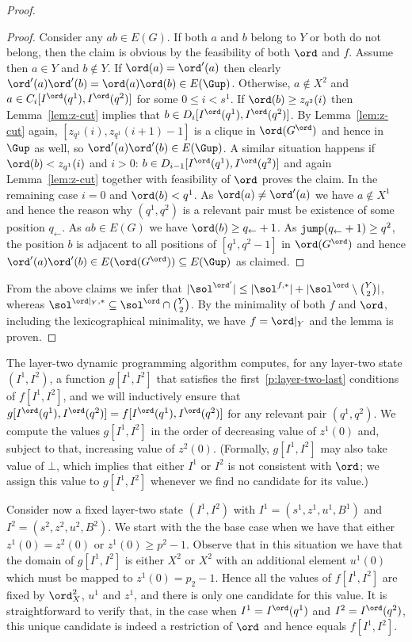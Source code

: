 \begin{proof}
\begin{proof}
Consider any $ab \in E(G)$. If both $a$ and $b$ belong to $Y$ or both do not belong,
then the claim is obvious by the feasibility of both $\ord$ and $f$.
Assume then $a \in Y$ and $b \notin Y$. If $\ord(a) = \ord'(a)$ then clearly $\ord'(a)\ord'(b) = \ord(a)\ord(b) \in E(\Gup)$. 
Otherwise, $a \notin X^2$ and $a \in C_i[I^\ord(q^1),I^\ord(q^2)]$ for some $0 \leq i < s^1$.
If $\ord(b) \geq z_{q^2}(i)$ then Lemma~\ref{lem:z-cut} implies that $b \in D_i[I^\ord(q^1),I^\ord(q^2)]$.
By Lemma~\ref{lem:z-cut} again, $[z_{q^1}(i),z_{q^1}(i+1)-1]$ is a clique in $\ord(G^\ord)$ and hence in $\Gup$ as well, so $\ord'(a)\ord'(b) \in E(\Gup)$.
A similar situation happens if $\ord(b) < z_{q^1}(i)$ and $i>0$: $b \in D_{i-1}[I^\ord(q^1),I^\ord(q^2)]$ and again Lemma~\ref{lem:z-cut}
together with feasibility of $\ord$ proves the claim.
In the remaining case $i = 0$ and $\ord(b) < q^1$. As $\ord(a) \neq \ord'(a)$ we have $a \notin X^1$ and hence the reason why $(q^1,q^2)$ is a relevant pair
must be existence of some position $q_\leftarrow$. As $ab \in E(G)$ we have $\ord(b) \geq q_\leftarrow+1$. As $\mathtt{jump}(q_\leftarrow+1) \geq q^2$,
the position $b$ is adjacent to all positions of $[q^1,q^2-1]$ in $\ord(G^\ord)$ and hence $\ord'(a)\ord'(b) \in E(\ord(G^\ord)) \subseteq E(\Gup)$ as claimed.
\cqed\end{proof}

From the above claims we infer that $|\sol^{\ord'}| \leq |\sol^{f,\ast}| + |\sol^\ord \setminus \binom{Y}{2}|$, whereas
$\sol^{\ord|_Y,\ast} \subseteq \sol^\ord \cap \binom{Y}{2}$.
By the minimality of both $f$ and $\ord$, including the lexicographical minimality, we have $f = \ord|_Y$ and the lemma is proven.
\end{proof}

The layer-two dynamic programming algorithm computes,
for any layer-two state $(I^1,I^2)$,   
a function $g[I^1,I^2]$
that satisfies the first~\ref{p:layer-two-last} conditions of $f[I^1,I^2]$, and we will inductively ensure that $g[I^\ord(q^1),I^\ord(q^2)] = f[I^\ord(q^1),I^\ord(q^2)]$
for any relevant pair $(q^1,q^2)$.
We compute the values $g[I^1,I^2]$ in the order of decreasing value of $z^1(0)$ and, subject to that, increasing value of $z^2(0)$.
(Formally, $g[I^1,I^2]$ may also take value of $\bot$, which implies that either $I^1$ or $I^2$ is not consistent with $\ord$;
 we assign this value to $g[I^1,I^2]$ whenever we find no candidate for its value.)

Consider now a fixed layer-two state $(I^1,I^2)$ with
$I^1 = (s^1,z^1,u^1,B^1)$ and $I^2 = (s^2,z^2,u^2,B^2)$.
We start with the the base case when we have that either $z^1(0) = z^2(0)$ or
$z^1(0) \geq p^2-1$. Observe that in this situation we have that the domain of $g[I^1,I^2]$ is either $X^2$ or $X^2$ with an additional element $u^1(0)$ which must be mapped to $z^1(0)=p_2-1$. Hence all the values of $f[I^1,I^2]$ are fixed by $\ord_X^2$, $u^1$ and $z^1$, and there is only one candidate for this value.
It is straightforward to verify that, in the case when $I^1 = I^\ord(q^1)$ and $I^2 = I^\ord(q^2)$, this
unique candidate is indeed a restriction of $\ord$ and hence equals $f[I^1,I^2]$.

